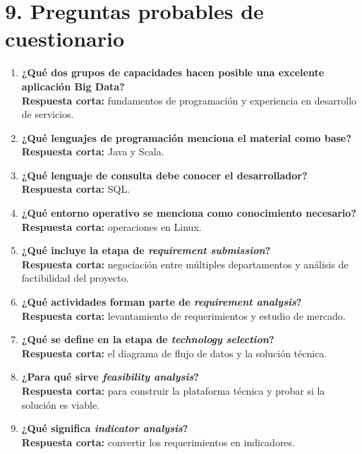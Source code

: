 \documentclass[8pt,a4paper,twocolumn]{article}
\begin{document}
\section*{9. Preguntas probables de cuestionario}

\begin{enumerate}[leftmargin=*]
    \item \textbf{¿Qué dos grupos de capacidades hacen posible una excelente aplicación Big Data?}\\
    \textbf{Respuesta corta:} fundamentos de programación y experiencia en desarrollo de servicios.
    
    \item \textbf{¿Qué lenguajes de programación menciona el material como base?}\\
    \textbf{Respuesta corta:} Java y Scala.
    
    \item \textbf{¿Qué lenguaje de consulta debe conocer el desarrollador?}\\
    \textbf{Respuesta corta:} SQL.
    
    \item \textbf{¿Qué entorno operativo se menciona como conocimiento necesario?}\\
    \textbf{Respuesta corta:} operaciones en Linux.
    
    \item \textbf{¿Qué incluye la etapa de \textit{requirement submission}?}\\
    \textbf{Respuesta corta:} negociación entre múltiples departamentos y análisis de factibilidad del proyecto.
    
    \item \textbf{¿Qué actividades forman parte de \textit{requirement analysis}?}\\
    \textbf{Respuesta corta:} levantamiento de requerimientos y estudio de mercado.
    
    \item \textbf{¿Qué se define en la etapa de \textit{technology selection}?}\\
    \textbf{Respuesta corta:} el diagrama de flujo de datos y la solución técnica.
    
    \item \textbf{¿Para qué sirve \textit{feasibility analysis}?}\\
    \textbf{Respuesta corta:} para construir la plataforma técnica y probar si la solución es viable.
    
    \item \textbf{¿Qué significa \textit{indicator analysis}?}\\
    \textbf{Respuesta corta:} convertir los requerimientos en indicadores.
    

\end{enumerate}
\end{document}

